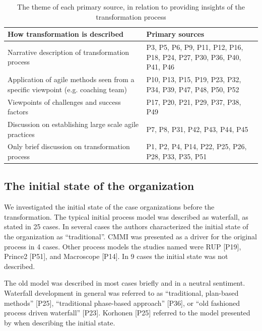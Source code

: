 \begin{table}[h]
    \centering
    \begin{tabular}{ >{\raggedright\arraybackslash}p{}
                     >{\raggedright\arraybackslash}p{} }
        \toprule
        How transformation is described   &  Primary sources  \\
        \midrule
        Narrative description of transformation process &
                P3, P5, P6, P9, P11, P12, P16, P18,
                P24, P27, P30, P36, P40, P41, P46   \\
        Application of agile methods seen from a specific viewpoint (e.g. coaching team) &
                P10, P13, P15, P19, P23, P32, P34,
                P39, P47, P48, P50, P52    \\
        Viewpoints of challenges and success factors  &
                P17, P20, P21, P29, P37, P38, P49   \\
        Discussion on establishing large scale agile practices  &
                P7, P8, P31, P42, P43, P44, P45   \\
        Only brief discussion on transformation process  &
                P1, P2, P4, P14, P22, P25, P26, P28, P33, P35, P51  \\
        \bottomrule
    \end{tabular}
    \caption{The theme of each primary source, in relation to providing
             insights of the transformation process}
    \label{table:transformation_descriptiontypes}
\end{table}


\subsection{The initial state of the organization}

We investigated the initial state of the case organizations before the
transformation. The typical initial process model was described as waterfall, as
stated in 25 cases. In several cases the authors characterized the initial state
of the organization as ``traditional''. CMMI was presented as a driver for the
original process in 4 cases. Other process models the studies named were RUP
[P19], Prince2 [P51], and Macroscope [P14]. In 9 cases the initial state was not
described.

The old model was described in most cases briefly and in a neutral sentiment.
Waterfall development in general was referred to as ``traditional, plan-based
methods'' [P25], ``traditional phase-based approach'' [P36], or ``old fashioned
process driven waterfall'' [P23]. Korhonen [P25] referred to the model presented
by \citet{Royce1970} when describing the initial state.

